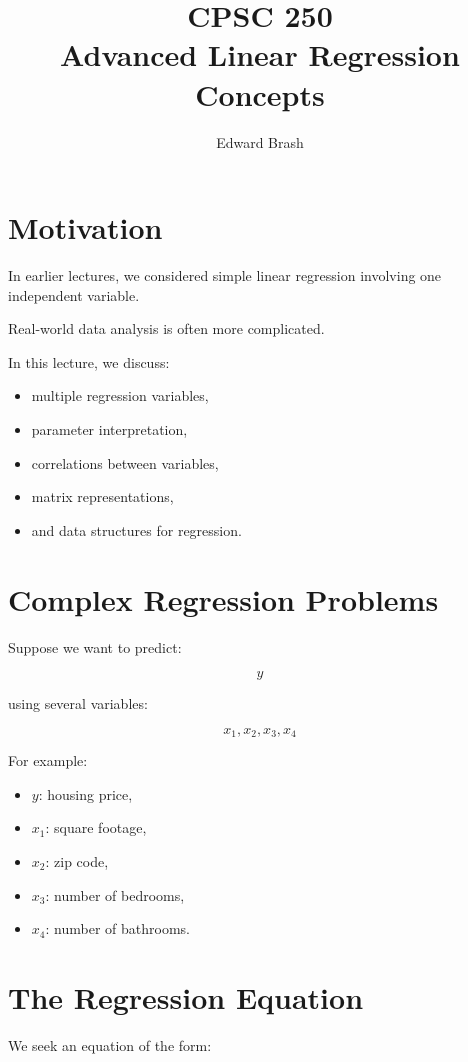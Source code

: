 \documentclass[11pt]{article}
\title{CPSC 250 \\ Advanced Linear Regression Concepts}
\author{Edward Brash}
\date{}
\begin{document}
\maketitle

\section{Motivation}

In earlier lectures, we considered simple linear regression involving one independent variable.

Real-world data analysis is often more complicated.

In this lecture, we discuss:

\begin{itemize}
    \item multiple regression variables,
    \item parameter interpretation,
    \item correlations between variables,
    \item matrix representations,
    \item and data structures for regression.
\end{itemize}

\section{Complex Regression Problems}

Suppose we want to predict:

\[
y
\]

using several variables:

\[
x_1, x_2, x_3, x_4
\]

For example:

\begin{itemize}
    \item \(y\): housing price,
    \item \(x_1\): square footage,
    \item \(x_2\): zip code,
    \item \(x_3\): number of bedrooms,
    \item \(x_4\): number of bathrooms.
\end{itemize}

\section{The Regression Equation}

We seek an equation of the form:
\end{document}
